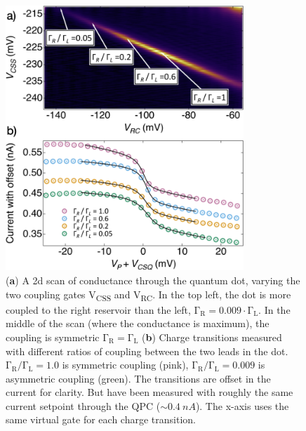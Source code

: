 \begin{figure}[!bht]
 \begin{center}
 \includegraphics[width=0.8\textwidth]{figures/ch3/crop_FiguresMaster.018.png}
 \caption[Varying coupling symmetry]{\label{fig:ch3/symmetry_picking} 
 (\textbf{a}) A 2d scan of conductance through the quantum dot, varying the two coupling gates V\textsubscript{CSS} and V\textsubscript{RC}. In the top left, the dot is more coupled to the right reservoir than the left, $\mathrm{\Gamma_R} = 0.009\cdot\mathrm{\Gamma_L}$. In the middle of the scan (where the conductance is maximum), the coupling is symmetric $\mathrm{\Gamma_R} = \mathrm{\Gamma_L}$ (\textbf{b}) Charge transitions measured with different ratios of coupling between the two leads in the dot. $\mathrm{\Gamma_R/\Gamma_L} = 1.0$ is symmetric coupling (pink), $\mathrm{\Gamma_R/\Gamma_L} = 0.009$ is asymmetric coupling (green). The transitions are offset in the current for clarity. But have been measured with roughly the same current setpoint through the QPC ($\sim\qty{0.4}{nA}$). The x-axis uses the same virtual gate for each charge transition. 
 }
 \end{center}
\end{figure}


